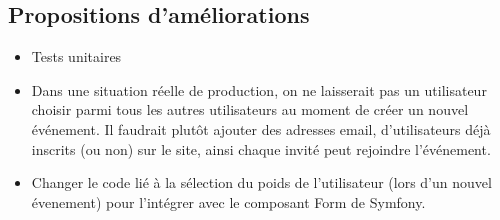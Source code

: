 \documentclass[a4paper, 12pt]{article}
\begin{document}
\subsection{Propositions d'améliorations}
\begin{itemize}
	\item Tests unitaires
	\item Dans une situation réelle de production, on ne laisserait pas un utilisateur choisir parmi tous les autres 
			utilisateurs au moment de créer un nouvel événement. Il faudrait plutôt ajouter des adresses email, 
			d'utilisateurs déjà inscrits (ou non) sur le site, ainsi chaque invité peut rejoindre l'événement.
	\item Changer le code lié à la sélection du poids de l'utilisateur (lors d'un nouvel évenement) pour l'intégrer 
			avec le composant Form de Symfony.
\end{itemize}
\end{document}

